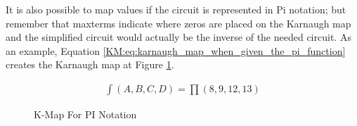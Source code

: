 It is also possible to map values if the circuit is represented in Pi notation; but remember that maxterms indicate where zeros are placed on the Karnaugh map and the simplified circuit would actually be the inverse of the needed circuit. As an example, Equation \ref{KM:eq:karnaugh_map_when_given_the_pi_function} creates the Karnaugh map at Figure \ref{KM:fig:kmap_for_pi_notation}. 

\begin{align}
  \label{KM:eq:karnaugh_map_when_given_the_pi_function}
  \int{(A,B,C,D)} = \prod(8,9,12,13)
\end{align}

\begin{figure}[H]
  \caption{K-Map For PI Notation}
  \label{KM:fig:kmap_for_pi_notation}
  \myfloatalign
\end{figure}
